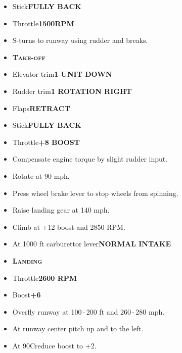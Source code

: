 \documentclass[a4paper,12pt,dvipsnames]{letter}
\newcommand{\button}[1]{\textbf{#1}}
\newcommand{\degC}{\textdegree{}C}
\newcommand{\myHead}[1]{{\LARGE\textsc{\textbf{#1}}}}
\begin{document}
{\begin{itemize}
 \begin{itemize}
  \item Stick\dotfill\button{FULLY BACK}
  \item Breaks\dotfill\button{SET}
  \item Throttle\dotfill\button{1800\;RPM}
  \item Throttle\dotfill\button{1000\;RPM}
  \item Breaks\dotfill\button{RELEASE}
 \end{itemize}
 \item Stick\dotfill\button{FULLY BACK}
 \item Throttle\dotfill\button{1500\;RPM}
 \item S-turns to runway using rudder and breaks.
\end{itemize}
\begin{itemize}
 \item[] \myHead{Take-off}
 \item Elevator trim\dotfill\button{1 UNIT DOWN}
 \item Rudder trim\dotfill\button{1 ROTATION RIGHT}
 \item Flaps\dotfill\button{RETRACT}
 \item Stick\dotfill\button{FULLY BACK}
 \item Throttle\dotfill\button{+8 BOOST}
 \item Compensate engine torque by slight rudder input.
 \item Rotate at 90 mph.
 \item Press wheel brake lever to stop wheels from spinning.
 \item Raise landing gear at 140 mph.
 \item Climb at +12 boost and 2850 RPM.
 \item At 1000 ft carburettor lever\dotfill\button{NORMAL INTAKE}
\end{itemize}
\newpage
\begin{itemize}
 \item[] \myHead{Landing}
 \item Throttle\dotfill\button{2600 RPM}
 \item Boost\dotfill\button{+6}
 \item Overfly runway at 100\,-\,200 ft and 260\,-\,280 mph.
 \item At runway center pitch up and to the left.
 \item At 90\degC reduce boost to +2.

\end{itemize}}
\end{document}
